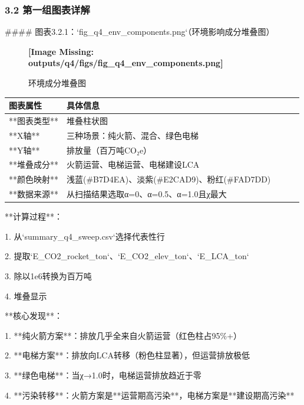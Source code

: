 \documentclass[a4paper,12pt]{article}
\begin{document}
\subsubsection{3.2 第一组图表详解}
#### 图表3.2.1：`fig\_q4\_env\_components.png`（环境影响成分堆叠图）

\par
\begin{figure}[h!]
\centering
\textbf{[Image Missing: outputs/q4/figs/fig_q4_env_components.png]}
\caption{环境成分堆叠图}
\end{figure}
\begin{center}
\begin{longtable}{|l|l|l|l|l|}
\hline
图表属性 & 具体信息 \\ \hline
**图表类型** & 堆叠柱状图 \\ \hline
**X轴** & 三种场景：纯火箭、混合、绿色电梯 \\ \hline
**Y轴** & 排放量（百万吨CO₂e） \\ \hline
**堆叠成分** & 火箭运营、电梯运营、电梯建设LCA \\ \hline
**颜色映射** & 浅蓝(#B7D4EA)、淡紫(#E2CAD9)、粉红(#FAD7DD) \\ \hline
**数据来源** & 从扫描结果选取α=0、α=0.5、α=1.0且χ最大 \\ \hline
\end{longtable}
\end{center}
**计算过程**：

\par
1. 从`summary\_q4\_sweep.csv`选择代表性行

\par
2. 提取`E\_CO2\_rocket\_ton`、`E\_CO2\_elev\_ton`、`E\_LCA\_ton`

\par
3. 除以1e6转换为百万吨

\par
4. 堆叠显示

\par
**核心发现**：

\par
1. **纯火箭方案**：排放几乎全来自火箭运营（红色柱占95\%+）

\par
2. **电梯方案**：排放向LCA转移（粉色柱显著），但运营排放极低

\par
3. **绿色电梯**：当χ→1.0时，电梯运营排放趋近于零

\par
4. **污染转移**：火箭方案是**运营期高污染**，电梯方案是**建设期高污染**
\end{document}
